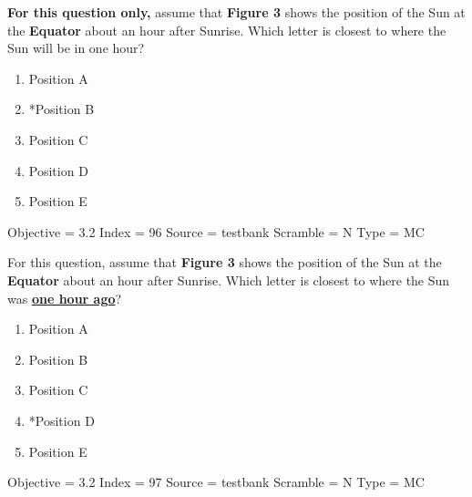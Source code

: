\documentclass[11pt]{article}
\begin{document}
\begin{enumerate}
\begin{minipage}{\textwidth}
\begin{minipage}{\textwidth}
\item {\bf For this question only,} assume that {\bf Figure 3} shows the position of the Sun at the {\bf Equator} about an hour after Sunrise.   Which letter is closest to where the Sun will be in one hour?
\begin{multicols}{3}
\begin{enumerate} 
\setlength{\itemsep}{1pt} 
\setlength{\parskip}{0pt} 
\setlength{\parsep}{0pt}
\setlength{\multicolsep}{1pt} 
\item Position A
\item *Position B
\item Position C
\item Position D
\item Position E
\end{enumerate} 
\vfill 
\end{multicols}

Objective = 3.2
Index = 96
Source = testbank
Scramble = N
Type = MC
\end{minipage}
\end{minipage}
\vskip 0.20in

\begin{minipage}{\textwidth}
\begin{minipage}{\textwidth}
\item For this question, assume that {\bf Figure 3} shows the position of the Sun at the {\bf Equator} about an hour after Sunrise.   Which letter is closest to where the Sun was \underline{\bf one hour ago}?
\begin{multicols}{3}
\begin{enumerate} 
\setlength{\itemsep}{1pt} 
\setlength{\parskip}{0pt} 
\setlength{\parsep}{0pt}
\setlength{\multicolsep}{1pt} 
\item Position A
\item Position B
\item Position C
\item *Position D
\item Position E
\end{enumerate} 
\vfill 
\end{multicols}

Objective = 3.2
Index = 97
Source = testbank
Scramble = N
Type = MC
\end{minipage}
\end{minipage}
\vskip 0.20in


\end{enumerate}
\end{document}
